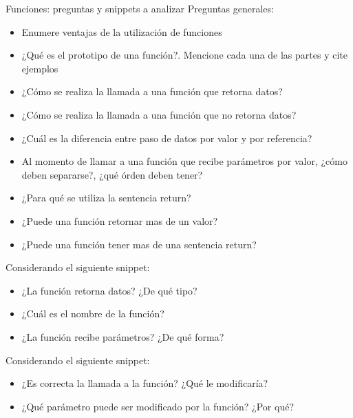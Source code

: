 \documentclass[xcolor=pdftex,table,11pt]{beamer}
\begin{document}
\begin{frame}[allowframebreaks]{Funciones: preguntas y snippets a analizar}
Preguntas generales:


\begin{itemize}
\item Enumere ventajas de la utilización de funciones
\item ¿Qué es el prototipo de una función?. Mencione cada una de las partes y cite ejemplos
\item ¿Cómo se realiza la llamada a una función que retorna datos?
\item ¿Cómo se realiza la llamada a una función que no retorna datos?\item ¿Cuál es la diferencia entre paso de datos por valor y por referencia?

\item Al momento de llamar a una función que recibe parámetros por valor, ¿cómo deben separarse?, ¿qué órden deben tener?


\item ¿Para qué se utiliza la sentencia return?
\item ¿Puede una función retornar mas de un valor?
\item ¿Puede una función tener mas de una sentencia return?

\end{itemize}
\newpage
Considerando el siguiente snippet:

\codesetstylefrombeamer
{}


\begin{itemize}

\item ¿La función retorna datos? ¿De qué tipo?
\item ¿Cuál es el nombre de la función? 
\item ¿La función recibe parámetros? ¿De qué forma?


\end{itemize}

\newpage
Considerando el siguiente snippet:

\codesetstylefrombeamer
{}


\begin{itemize}

\item ¿Es correcta la llamada a la función? ¿Qué le modificaría?
\item ¿Qué parámetro puede ser modificado por la función? ¿Por qué? 


\end{itemize}
\end{frame}
\end{document}
